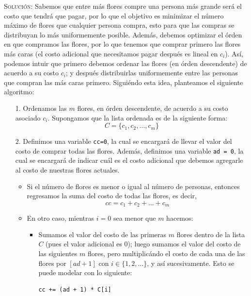 \documentclass[letterpaper,11pt]{article}
\begin{document}
\begin{enumerate}
    \textsc{Solución:} Sabemos que entre más flores compre una persona más 
    grande será el costo que tendrá que pagar, por lo que el objetivo es 
    minimizar el número máximo de flores que cualquier persona compra, esto 
    para que las compras se distribuyan lo más uniformemente posible. 
    Además, debemos optimizar el órden en que compramos las flores, por lo 
    que tenemos que comprar primero las flores más caras (el costo adicional 
    que necesitamos pagar después es lineal en $c_i$). Así, podemos intuir 
    que primero debemos ordenar las flores (en órden descendente) de acuerdo 
    a su costo $c_i$; y después distribuirlas uniformemente entre las 
    personas que compran las más caras primero. Siguiéndo esta idea, planteamos 
    el siguiente algoritmo:
    \begin{itemize}
        \item[1.] Ordenamos las $m$ flores, en órden descendente, de acuerdo a 
        su costo asociado $c_i$. Supongamos que la lista ordenada es de la 
        siguiente forma:
        \begin{equation*}
            C = \{c_1, c_2, \ldots, c_m\}
        \end{equation*}

        \item[2.] Definimos una variable \texttt{cc=0}, la cual se encargará de 
        llevar el valor del costo de comprar todas las flores. Además, definimos 
        una variable \texttt{ad = 0}, la cual se encargará de indicar cuál es el 
        costo adicional que debemos agregarle al costo de nuestras flores 
        actuales.
        \begin{itemize}
            \item Si el número de flores es menor o igual al número de personas,
            entonces regresamos la suma del costo de todas las flores, es decir, 
            \begin{equation*}
                cc = c_1 + c_2 + \ldots + c_m
            \end{equation*}

            \item En otro caso, mientras $i=0$ sea menor que $m$ hacemos:
            \begin{itemize}
                \item Sumamos el valor del costo de las primeras $m$ flores 
                dentro de la lista $C$ (pues el valor adicional es $0$); luego 
                sumamos el valor del costo de las siguientes $m$ flores, pero
                multiplicándo el costo de cada una de las flores por $[ad + 1]$ 
                con $i \in \{1, 2, \ldots\}$, y así sucesivamente. Esto se 
                puede modelar con lo siguiente:
                \begin{center}
                    \texttt{cc += (ad + 1) * C[i]}
                \end{center}


\end{itemize}
\end{itemize}
\end{itemize}
\end{enumerate}
\end{document}
